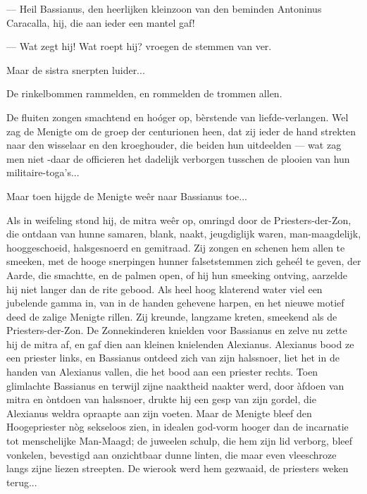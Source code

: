 \documentclass[a4paper, 12pt, oneside, dutch]{article}
\begin{document}
--- Heil Bassianus, den heerlijken kleinzoon van den beminden Antoninus Caracalla, hij, die aan ieder een mantel gaf!

--- Wat zegt hij! Wat roept hij? vroegen de stemmen van ver.

Maar de sistra snerpten luider...

De rinkelbommen rammelden, en rommelden de trommen allen.

De fluiten zongen smachtend en hoóger op, bèrstende van liefde-verlangen. Wel zag de Menigte om de groep der centurionen heen, dat zij ieder de hand strekten naar den wisselaar en den kroeghouder, die beiden hun uitdeelden --- wat zag men niet -daar de officieren het dadelijk verborgen tusschen de plooien van hun militaire-toga's...

Maar toen hijgde de Menigte weêr naar Bassianus toe...

Als in weifeling stond hij, de mitra weêr op, omringd door de Priesters-der-Zon, die ontdaan van hunne samaren, blank, naakt, jeugdiglijk waren, man-maagdelijk, hooggeschoeid, halsgesnoerd en gemitraad. Zij zongen en schenen hem allen te smeeken, met de hooge snerpingen hunner falsetstemmen zich geheél te geven, der Aarde, die smachtte, en de palmen open, of hij hun smeeking ontving, aarzelde hij niet langer dan de rite gebood. Als heel hoog klaterend water viel een jubelende gamma in, van in de handen gehevene harpen, en het nieuwe motief deed de zalige Menigte rillen. Zij kreunde, langzame kreten, smeekend als de Priesters-der-Zon. De Zonnekinderen knielden voor Bassianus en zelve nu zette hij de mitra af, en gaf dien aan kleinen knielenden Alexianus. Alexianus bood ze een priester links, en Bassianus ontdeed zich van zijn halssnoer, liet het in de handen van Alexianus vallen, die het bood aan een priester rechts. Toen glimlachte Bassianus en terwijl zijne naaktheid naakter werd, door àfdoen van mitra en òntdoen van halssnoer, drukte hij een gesp van zijn gordel, die Alexianus weldra opraapte aan zijn voeten. Maar de Menigte bleef den Hoogepriester nòg sekseloos zien, in idealen god-vorm hooger dan de incarnatie tot menschelijke Man-Maagd; de juweelen schulp, die hem zijn lid verborg, bleef vonkelen, bevestigd aan onzichtbaar dunne linten, die maar even vleeschroze langs zijne liezen streepten. De wierook werd hem gezwaaid, de priesters weken terug...
\end{document}
